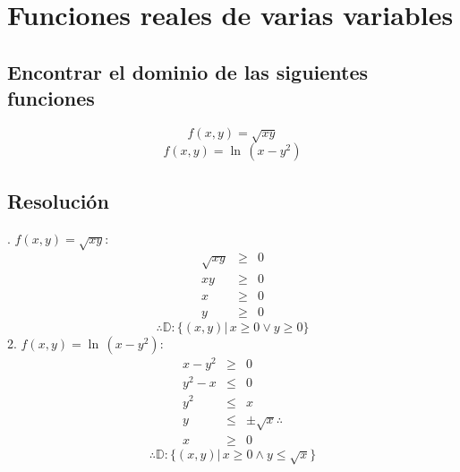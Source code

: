 \documentclass[letterpaper, 12pt]{article}
\begin{document}
\setcounter{page}{1}
\thispagestyle{fancy}
\section*{Funciones reales de varias variables}
\subsection*{Encontrar el dominio de las siguientes funciones}
\[f(x,y)=\sqrt{xy}\]
\[f(x,y)=\ln\,(x-y^2)\]
\subsection*{Resolución}
. \(f(x,y)=\sqrt{xy}\):
\[\begin{matrix}
    \sqrt{xy}&\geq&0\\
    xy&\geq&0\\
    x&\geq&0\\
    y&\geq&0
\end{matrix}\]
\[\therefore \mathbb{D}: \{(x,y)|\, x \geq 0 \lor y \geq 0 \}\]
2. \(f(x,y)=\ln\, (x-y^2)\):
\[\begin{matrix}
    x-y^2&\geq&0\\
    y^2-x&\leq&0\\
    y^2&\leq&x\\
    y&\leq&\pm \sqrt{x} \therefore\\
    x&\geq&0
\end{matrix}\]
\[\therefore \mathbb{D}: \{(x,y)|\, x \geq 0 \land y \leq \sqrt{x}\}\]
\end{document}

